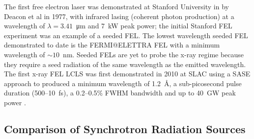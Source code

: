 \documentclass[../main.tex]{subfiles}
\begin{document}
The first free electron laser was demonstrated at Stanford University in by Deacon et al \cite{deacon1977first} in 1977, with infrared lasing (coherent photon production) at a wavelength of $\lambda = 3.41$~\si{\micro\meter} and 7~\si{\kilo\watt} peak power; the initial Stanford FEL experiment was an example of a seeded FEL. The lowest wavelength seeded FEL demonstrated to date is the FERMI@ELETTRA FEL \cite{allaria2012highly} with a minimum wavelength of $\sim10$~\si{\nano\meter}. Seeded FELs are yet to probe the x-ray regime because they require a seed radiation of the same wavelength as the emitted wavelength. The first x-ray FEL LCLS was first demonstrated in 2010 at SLAC using a SASE approach to produced a minimum wavelength of 1.2~\si{\angstrom}, a sub-picosecond pulse duration (500--10~\si{\femto\second}), a 0.2--0.5\% FWHM bandwidth and up to 40~\si{\giga\watt} peak power \cite{emma2010first}.

\subsection{Comparison of Synchrotron Radiation Sources}
\end{document}
